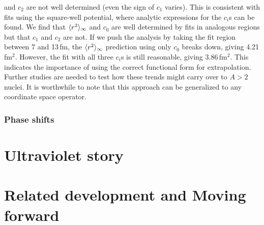 	and $c_2$ are not well determined (even the sign of $c_1$
	varies).  This is consistent with
	fits using the square-well potential, where analytic expressions
	for the $c_i$s can be found.  We find that $\langle r^2 \rangle_{\infty}$
	and $c_0$ are well determined by fits in analogous
	regions but that $c_1$ and $c_2$ are not.
	If we push the analysis by taking the fit region between 7 and 13\,fm,
	the $\langle r^2 \rangle_{\infty}$ prediction using only $c_0$ breaks down, giving
	4.21\,fm$^2$.  However, the fit with all three $c_i$s is still
	reasonable, giving 3.86\,fm$^2$.  This indicates the importance of using
	the correct functional form for extrapolation.
	Further studies are needed to test how these trends might carry
	over to $A>2$ nuclei.  It is worthwhile to note that this approach can
	be generalized to any coordinate space operator.

	\subsubsection{Phase shifts}


	\section{Ultraviolet story}
	\label{Sec:UV_story}

	\section{Related development and Moving forward}

	\label{sec:related_development_IR}
